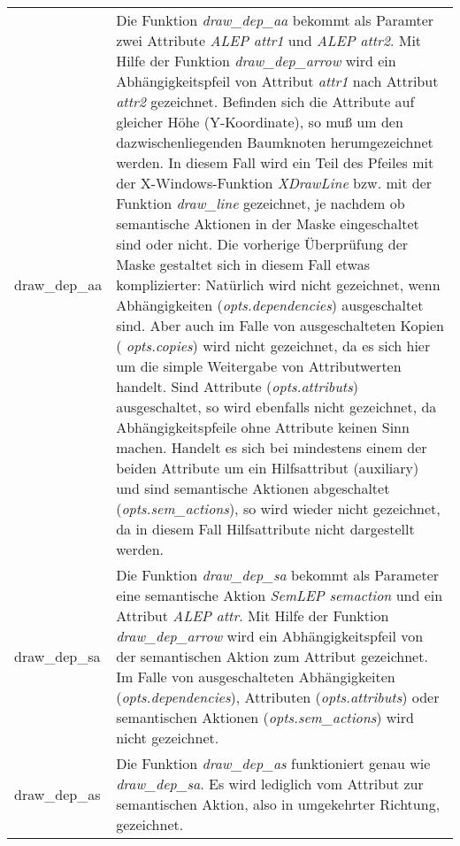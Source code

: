 \begin{tabular}{|l|p{9.0cm}|}
\hline
draw\_dep\_aa & Die Funktion {\it draw\_dep\_aa} bekommt als Paramter zwei Attribute {\it ALEP attr1} und {\it ALEP attr2}. Mit Hilfe der Funktion
{\it draw\_dep\_arrow} wird ein Abh\"angigkeitspfeil von Attribut {\it attr1} nach Attribut {\it attr2} gezeichnet. Befinden sich die
Attribute auf gleicher H\"ohe (Y-Koordinate), so mu\ss{} um den dazwischenliegenden Baumknoten herumgezeichnet werden. In diesem Fall wird ein Teil des
Pfeiles mit der X-Windows-Funktion {\it XDrawLine} bzw. mit der Funktion {\it draw\_line} gezeichnet, je nachdem ob semantische
Aktionen in der Maske eingeschaltet sind oder nicht. Die vorherige \"Uberpr\"ufung der Maske gestaltet sich in diesem Fall etwas komplizierter: Nat\"urlich
wird nicht gezeichnet, wenn Abh\"angigkeiten ({\it opts.dependencies}) ausgeschaltet sind. Aber auch im Falle von ausgeschalteten Kopien ({\it
opts.copies}) wird nicht gezeichnet, da es sich hier um die simple Weitergabe von Attributwerten handelt. Sind Attribute ({\it opts.attributs})
ausgeschaltet, so wird ebenfalls nicht gezeichnet, da Abh\"angigkeitspfeile ohne Attribute keinen Sinn machen. Handelt es sich bei mindestens einem der
beiden Attribute um ein Hilfsattribut (auxiliary) und sind semantische Aktionen abgeschaltet ({\it opts.sem\_actions}), so wird wieder nicht
gezeichnet, da in diesem Fall Hilfsattribute nicht dargestellt werden.\\
draw\_dep\_sa & Die Funktion {\it draw\_dep\_sa} bekommt als Parameter eine
semantische Aktion {\it SemLEP semaction} und ein Attribut {\it ALEP attr}. Mit Hilfe der Funktion {\it draw\_dep\_arrow} wird ein
Abh\"angigkeitspfeil von der semantischen Aktion zum Attribut gezeichnet. Im Falle von ausgeschalteten Abh\"angigkeiten ({\it opts.dependencies}),
Attributen ({\it opts.attributs}) oder semantischen Aktionen ({\it opts.sem\_actions}) wird nicht gezeichnet. \\
draw\_dep\_as & Die Funktion {\it
draw\_dep\_as} funktioniert genau wie {\it draw\_dep\_sa}. Es wird lediglich vom Attribut zur semantischen Aktion, also in
umgekehrter Richtung, gezeichnet. \\
\hline
\end{tabular}

